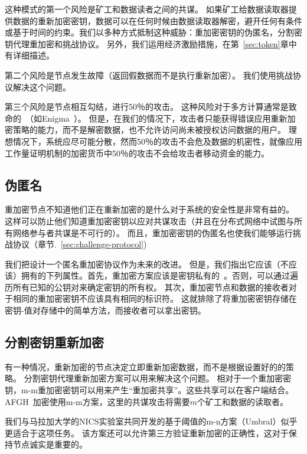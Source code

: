 \documentclass[longbibliography,nofootinbib]{revtex4-1}
\begin{document}
\begin{CJK*}{UTF8}{gbsn}
    这种模式的第一个风险是矿工和数据读者之间的共谋。 如果矿工给数据读取器提供数据的重新加密密钥，数据可以在任何时候由数据读取器解密，避开任何有条件或基于时间的约束。我们以多种方式抵制这种威胁：重加密密钥的伪匿名，分割密钥代理重加密和挑战协议。 另外，我们运用经济激励措施，在第~\ref{sec:token}章中有详细描述。

第二个风险是节点发生故障（返回假数据而不是执行重新加密）。 我们使用挑战协议解决这个问题。

第三个风险是节点相互勾结，进行50％的攻击。 这种风险对于多方计算通常是致命的~\cite{vitalik-secret-dao}（如Enigma~\cite{enigma}）。 但是，在我们的情况下，攻击者只能获得错误应用重新加密策略的能力，而不是解密数据，也不允许访问尚未被授权访问数据的用户。 理想情况下，系统应尽可能分散，然而50％的攻击不会危及数据的机密性，就像应用工作量证明机制的加密货币中50％的攻击不会给攻击者移动资金的能力。

\subsection{伪匿名}
\label{sec:anonymity}

重加密节点不知道他们正在重新加密的是什么对于系统的安全性是非常有益的。 这样可以防止他们知道重加密密钥以应对共谋攻击（并且在分布式网络中试图与所有网络参与者共谋是不可行的）。 而且，重加密密钥的伪匿名也使我们能够运行挑战协议（章节.~\ref{sec:challenge-protocol})

我们把设计一个匿名重加密协议作为未来的改进。 但是，我们指出它应该（不应该）拥有的下列属性。首先，重加密方案应该是密钥私有的~\cite{Ateniese-key-private,lwe-reencryption}。否则，可以通过遍历所有已知的公钥对来确定密钥的所有权。 其次，重加密节点和数据的接收者对于相同的重加密密钥不应该具有相同的标识符。 这就排除了将重加密密钥存储在密钥-值对存储中的简单方法，而接收者可以拿出密钥。

\subsection{分割密钥重新加密}
\label{sec:split-key}

有一种情况，重新加密的节点决定立即重新加密数据，而不是根据设置好的的策略。 分割密钥代理重新加密方案可以用来解决这个问题。
    相对于一个重加密密钥，m-m重加密密钥可以用来产生“重加密共享”。这些共享可以在客户端结合。AFGH~\cite{AFGH}加密使用m-m方案，这里的共谋攻击将需要$m$个矿工和数据的读取者。
    
    我们与马拉加大学的NICS实验室共同开发的基于阈值的m-n方案（Umbral）似乎更适合于这项任务。 该方案还可以允许第三方验证重新加密的正确性，这对于保持节点诚实是重要的。


\end{CJK*}
\end{document}
